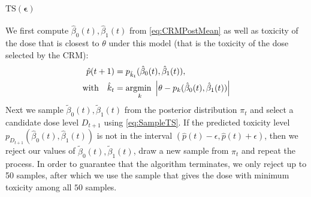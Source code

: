 



\paragraph{$\bm{\mathrm{TS}(\epsilon)}$}  We first compute $\hat\beta_0(t),\hat{\beta}_1(t)$ from \eqref{eq:CRMPostMean} as well as toxicity of the dose that is closest to $\theta$ under this model (that is the toxicity of the dose selected by the CRM): 
\begin{align*}
\hat{p}(t+1) &= p_{\hat k_{t}}(\hat\beta_0(t),\hat\beta_1(t)),
\\ 
\text{with} \ \ \ \hat k_{t} &=\underset{k}{\text{argmin }}\left|\theta - p_k(\hat\beta_0(t),\hat\beta_1(t))\right| 
\end{align*}
Next we sample $\tilde \beta_0(t), \tilde{\beta}_1(t)$ from the posterior distribution $\pi_t$
and select a candidate dose level $D_{t+1}$ using \eqref{eq:SampleTS}.
If the predicted toxicity level $p_{D_{t+1}}(\hat\beta_0(t),\hat{\beta}_1(t))$ is not in the
interval $(\hat{p}(t)-\epsilon, \hat{p}(t)+\epsilon)$, then we reject
our values of $\tilde\beta_0(t),\tilde{\beta}_1(t)$, draw a new sample from $\pi_t$ and repeat the process. 
In order to guarantee that the algorithm terminates, we only reject up to
50 samples, after which we use the sample that gives the dose with minimum toxicity among all $50$ samples.

